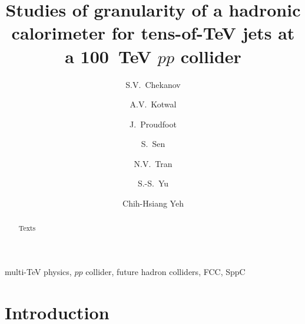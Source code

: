 \documentclass[final,1p,11pt]{elsarticle}
\begin{document}
\begin{frontmatter}

\title{
Studies of granularity of a hadronic calorimeter for tens-of-TeV jets  at a 100~TeV $pp$ collider 
}

\author[add1]{S.V.~Chekanov}

\author[addDuke,add2]{A.V.~Kotwal}

\author[add1]{J.~Proudfoot}

\author[addDuke]{S.~Sen}

\author[add2]{N.V.~Tran}

\author[add3]{S.-S.~Yu}

\author[add3]{Chih-Hsiang Yeh}

\address[add1]{
HEP Division, Argonne National Laboratory,
9700 S.~Cass Avenue,
Argonne, IL 60439, USA. 
}

\address[addDuke]{
Department of Physics, Duke University, USA
}

\address[add2]{
Fermi National Accelerator Laboratory
}

\address[addMSU]{
Department of Physics, Michigan State University, 220
Trowbridge Road, East Lansing, MI 48824 
}


\address[add3]{
Department of Physics, National Central University, Chung-Li, Taoyuan City 32001, Taiwan
}


\begin{abstract}
Texts

\end{abstract}

\begin{keyword}
multi-TeV physics, $pp$ collider, future hadron colliders, FCC, SppC
\end{keyword}



\end{frontmatter}



\section{Introduction}
\end{document}
